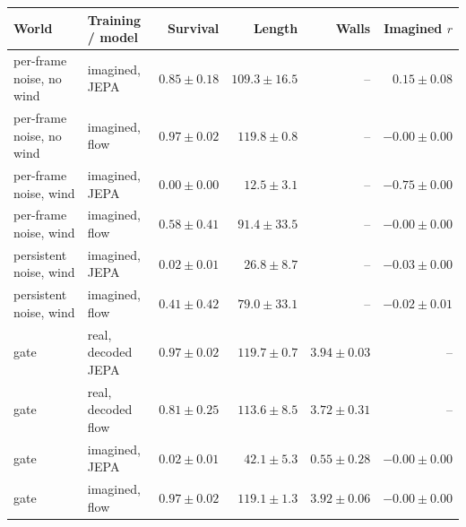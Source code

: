 \setlength{\tabcolsep}{4pt}
\begin{tabular}{llrrrr}
\toprule
\rowcolor{Navy!8}
World & Training / model & Survival & Length & Walls & Imagined $r$ \\
\midrule
\rowcolor{JEPA!7}
per-frame noise, no wind & imagined, JEPA & $0.85\pm0.18$ & $109.3\pm16.5$ & -- & $0.15\pm0.08$ \\
\rowcolor{Flow!7}
per-frame noise, no wind & imagined, flow & $0.97\pm0.02$ & $119.8\pm0.8$ & -- & $-0.00\pm0.00$ \\
\midrule
\rowcolor{JEPA!7}
per-frame noise, wind & imagined, JEPA & $0.00\pm0.00$ & $12.5\pm3.1$ & -- & $-0.75\pm0.00$ \\
\rowcolor{Flow!7}
per-frame noise, wind & imagined, flow & $0.58\pm0.41$ & $91.4\pm33.5$ & -- & $-0.00\pm0.00$ \\
\midrule
\rowcolor{JEPA!7}
persistent noise, wind & imagined, JEPA & $0.02\pm0.01$ & $26.8\pm8.7$ & -- & $-0.03\pm0.00$ \\
\rowcolor{Flow!7}
persistent noise, wind & imagined, flow & $0.41\pm0.42$ & $79.0\pm33.1$ & -- & $-0.02\pm0.01$ \\
\midrule
\rowcolor{Real!7}
gate & real, decoded JEPA & $0.97\pm0.02$ & $119.7\pm0.7$ & $3.94\pm0.03$ & -- \\
\rowcolor{Real!7}
gate & real, decoded flow & $0.81\pm0.25$ & $113.6\pm8.5$ & $3.72\pm0.31$ & -- \\
\rowcolor{JEPA!7}
gate & imagined, JEPA & $0.02\pm0.01$ & $42.1\pm5.3$ & $0.55\pm0.28$ & $-0.00\pm0.00$ \\
\rowcolor{Flow!7}
gate & imagined, flow & $0.97\pm0.02$ & $119.1\pm1.3$ & $3.92\pm0.06$ & $-0.00\pm0.00$ \\
\bottomrule
\end{tabular}

